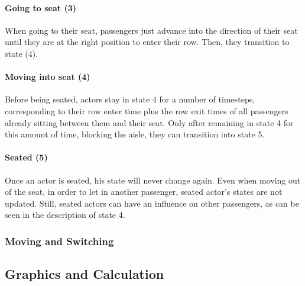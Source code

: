 \documentclass[11pt]{article}
\begin{document}
\paragraph{Going to seat (3)}
When going to their seat, passengers just advance into the direction of their seat until they are at the right position to enter their row. Then, they transition to state (4).


\paragraph{Moving into seat (4)}
Before being seated, actors stay in state 4 for a number of timesteps, corresponding to their row enter time plus the row exit times of all passengers already sitting between them and their seat. Only after remaining in state 4 for this amount of time, blocking the aisle, they can transition into state 5.

\paragraph{Seated (5)}
Once an actor is seated, his state will never change again. Even when moving out of the seat, in order to let in another passenger, seated actor's states are not updated. Still, seated actors can have an influence on other passengers, as can be seen in the description of state 4.


\subsubsection{Moving and Switching}





\subsection{Graphics and Calculation}


 
\end{document}
